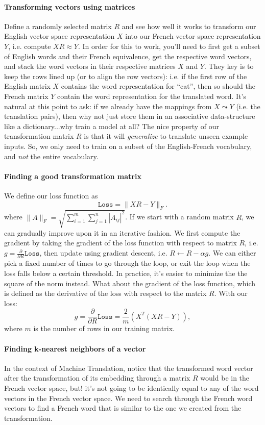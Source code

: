 \documentclass[12pt]{article}
\begin{document}
\paragraph{Transforming vectors using matrices} Define a randomly selected matrix $R$ and see how well it works to transform our English vector space representation $X$ into our French vector space representation $Y$, i.e. compute $XR \approx Y$. In order for this to work, you'll need to first get a subset of English words and their French equivalence, get the respective word vectors, and stack the word vectors in their respective matrices $X$ and $Y$. They key is to keep the rows lined up (or to align the row vectors): i.e. if the first row of the English matrix $X$ contains the word representation for ``cat'', then so should the French matrix $Y$ contain the word representation for the translated word. It's natural at this point to ask: if we already have the mappings from $X \leadsto Y$ (i.e. the translation pairs), then why not just store them in an associative data-structure like a dictionary...why train a model at all? The nice property of our transformation matrix $R$ is that it will \emph{generalize} to translate unseen example inputs. So, we only need to train on a subset of the English-French vocabulary, and \emph{not} the entire vocabulary.

\paragraph{Finding a good transformation matrix} We define our loss function as
\[
  \texttt{Loss} = \|XR - Y\|_F.
\]
where $\|A\|_F = \sqrt{\sum_{i=1}^m \sum_{j=1}^n |A_{ij}|^2}$.
If we start with a random matrix $R$, we can gradually improve upon it in an iterative fashion. We first compute the gradient by taking the gradient of the loss function with respect to matrix $R$, i.e. $g = \frac{\partial}{\partial R}\texttt{Loss}$, then update using gradient descent, i.e. $R \gets R - \alpha g$. We can either pick a fixed number of times to go through the loop, or exit the loop when the loss falls below a certain threshold. In practice, it's easier to minimize the the square of the norm instead. What about the gradient of the loss function, which is defined as the derivative of the loss with respect to the matrix $R$. With our loss:
\[
  g = \frac{\partial}{\partial R} \texttt{Loss} = \frac{2}{m} \left(X^T(XR - Y)\right),
\]
where $m$ is the number of rows in our training matrix.

\paragraph{Finding k-nearest neighbors of a vector} In the context of Machine Translation, notice that the transformed word vector after the transformation of its embedding through a matrix $R$ would be in the French vector space, but! it's not going to be identically equal to any of the word vectors in the French vector space. We need to search through the French word vectors to find a French word that is similar to the one we created from the transformation.
\end{document}

